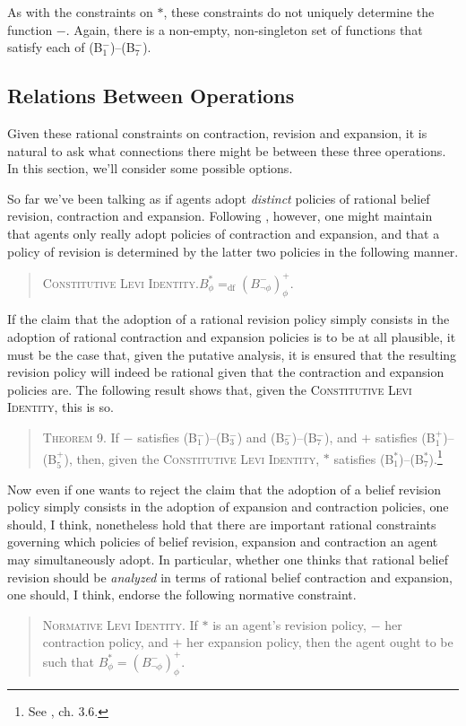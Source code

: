 As with the constraints on $*$, these constraints do not uniquely determine the function $-$.
Again, there is a non-empty, non-singleton set of functions that satisfy each of (B$^-_1$)--(B$^-_7$).


\subsection{Relations Between Operations}\label{caie-section2-2}

Given these rational constraints on contraction, revision and expansion, it is natural to ask what connections there might be between these three operations.
In this section, we'll consider some possible options.

So far we've been talking as if agents adopt \textit{distinct} policies of rational belief revision, contraction and expansion.
Following \citet{Levi1}, however, one might maintain that agents only really adopt policies of contraction and expansion, and that a policy of revision is determined by the latter two policies in the following manner.
\begin{quote}
\textsc{Constitutive Levi Identity.}\quad $B^*_\phi =_{\text{df}} (B^-_{\lnot \phi})^+_\phi$.
\end{quote}
If the claim that the adoption of a rational revision policy simply consists in the adoption of rational contraction and expansion policies is to be at all plausible, it must be the case that, given the putative analysis, it is ensured that the resulting revision policy will indeed be rational given that the contraction and expansion policies are.
The following result shows that, given the \textsc{Constitutive Levi Identity}, this is so.
\begin{quote}
\textsc{Theorem 9.}\; If $-$ satisfies (B$^-_1$)--(B$^-_3$) and (B$^-_5$)--(B$^-_7$), and $+$ satisfies (B$^+_1$)--(B$^+_5$), then, given the \textsc{Constitutive Levi Identity}, $*$ satisfies (B$^*_1$)--(B$^*_7$).\footnote{See \citet{Gardenfors1}, ch. 3.6.}
\end{quote}

Now even if one wants to reject the claim that the adoption of a belief revision policy simply consists in the adoption of expansion and contraction policies, one should, I think, nonetheless hold that there are important rational constraints governing which policies of belief revision, expansion and contraction an agent may simultaneously adopt.
In particular, whether one thinks that rational belief revision should be \textit{analyzed} in terms of rational belief contraction and expansion, one should, I think, endorse the following normative constraint.
\begin{quote}
\textsc{Normative Levi Identity.}\; If $*$ is an agent's revision policy, $-$ her contraction policy, and $+$ her expansion policy, then the agent ought to be such that  $B^*_\phi = (B^-_{\lnot \phi})^+_\phi$.
\end{quote}

